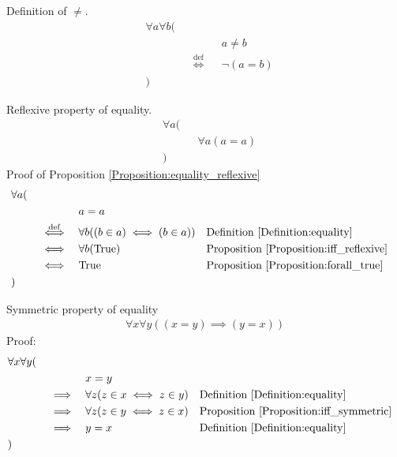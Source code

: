 \begin{defn}
\label{Definition:neq}
Definition of $\neq$.
\begin{align*}
& \forall a \forall b ( \\
& \quad && && a \neq b \\
& \quad && \overset{\operatorname{def}}{\iff} && \lnot (a = b) \\
& )
\end{align*}
\end{defn}

\begin{prop}
\label{Proposition:equality_reflexive}
Reflexive property of equality.
\begin{align*}
& \forall a ( \\
& \quad && \forall a (a = a) \\
& )
\end{align*}
Proof of Proposition \ref{Proposition:equality_reflexive}
\begin{align*}
& \forall a ( \\
& \quad && && a = a \\
& \quad && \overset{\operatorname{def}}{\iff} && \forall b ((b \in a) \iff (b \in a))
&& \text{Definition \ref{Definition:equality}} \\
& \quad && \iff && \forall b (\text{True})
&& \text{Proposition \ref{Proposition:iff_reflexive}} \\
& \quad && \iff && \text{True}
&& \text{Proposition \ref{Proposition:forall_true}} \\
& )
\end{align*}
\end{prop}

\begin{prop}
Symmetric property of equality
\begin{align*}
\forall x \forall y ((x = y) \implies (y=x))
\end{align*}
Proof:
\begin{align*}
& \forall x \forall y ( \\
& \quad &&  &&  x = y \\
& \quad && \implies &&  \forall z (z \in x \iff z \in y)
&& \text{Definition \ref{Definition:equality}} \\
& \quad && \implies &&  \forall z (z \in y \iff z \in x)
&& \text{Proposition \ref{Proposition:iff_symmetric}} \\
& \quad && \implies && y = x
&& \text{Definition \ref{Definition:equality}} \\
& )
\end{align*}
\end{prop}

